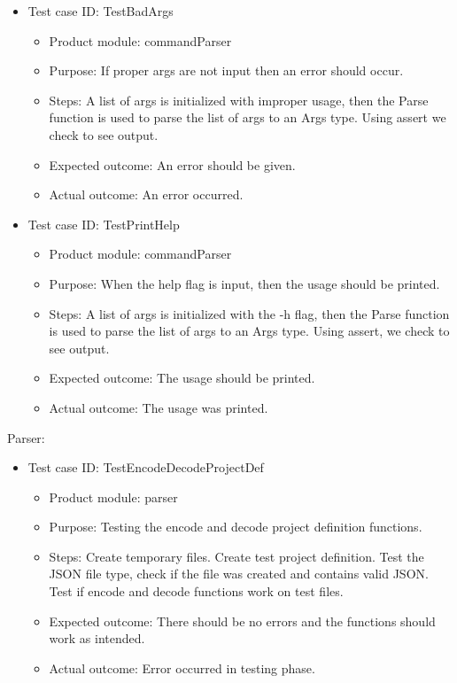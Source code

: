 \documentclass[11pt]{article}
\begin{document}
\begin{itemize}
    \item Test case ID: TestBadArgs
    \begin{itemize}
        \item Product module: commandParser
        \item Purpose: If proper args are not input then an error should occur.
        \item Steps: A list of args is initialized with improper usage, then the Parse function is used to parse the list of args to an Args type. Using assert we check to see output.
        \item Expected outcome: An error should be given.
        \item Actual outcome: An error occurred.
    \end{itemize}
\end{itemize}

\begin{itemize}
    \item Test case ID: TestPrintHelp
    \begin{itemize}
        \item Product module: commandParser
        \item Purpose: When the help flag is input, then the usage should be printed.
        \item Steps: A list of args is initialized with the -h flag, then the Parse function is used to parse the list of args to an Args type. Using assert, we check to see output.
        \item Expected outcome: The usage should be printed.
        \item Actual outcome: The usage was printed.
    \end{itemize}
\end{itemize}

Parser:
\begin{itemize}
    \item Test case ID: TestEncodeDecodeProjectDef
    \begin{itemize}
        \item Product module: parser
        \item Purpose: Testing the encode and decode project definition functions.
        \item Steps: Create temporary files. Create test project definition. Test the JSON file type, check if the file was created and contains valid JSON. Test if encode and decode functions work on test files.
        \item Expected outcome: There should be no errors and the functions should work as intended.
        \item Actual outcome: Error occurred in testing phase.
    \end{itemize}
\end{itemize}
\end{document}
